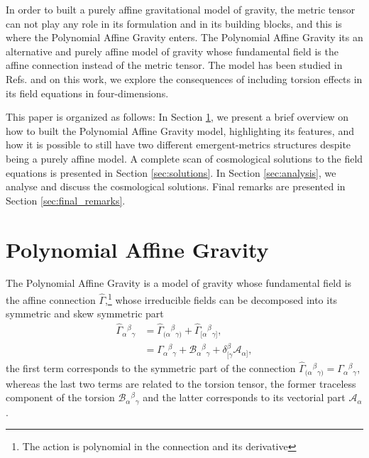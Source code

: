 \documentclass{article}
\providecommand{\ctG}[3]{\Gamma_{#1}{}^{ #2}{}_{#3}}
\providecommand{\B}[3]{\mathcal{B}_{#1}{}^{ #2}{}_{#3}}
\providecommand{\A}[1]{\mathcal{A}_{#1}}
\begin{document}
In order to built a purely affine gravitational model of gravity, the metric tensor can not play any role in its formulation and in its building blocks, and this is
where the Polynomial Affine Gravity enters. The Polynomial Affine Gravity its an alternative and purely affine model of gravity whose fundamental field is the affine connection instead
of the metric tensor. The model has been studied in Refs.\cite{castillofelisola2016polynomial,castillofelisola2016einsteins,castillofelisola2019cosmological,
Castillo_Felisola_2018,Castillo_Felisola_2020,Castillo_Felisola_2022_EPJC,Castillo_Felisola_2022_Universe} and on this work, we explore the
consequences of including torsion effects in its field equations in four-dimensions.

This paper is organized as follows: In Section \ref{sec:PAG}, we present a brief overview on how to built the Polynomial Affine Gravity model, highlighting
its features, and how it is possible to still have two different emergent-metrics structures despite being a purely affine model. A complete scan of cosmological
solutions to the field equations is presented in Section \ref{sec:solutions}. In Section \ref{sec:analysis}, we analyse and discuss the cosmological 
solutions. Final remarks are presented in Section \ref{sec:final_remarks}. 

\section{Polynomial Affine Gravity}
\label{sec:PAG}

The Polynomial Affine Gravity is a model of gravity whose fundamental field is the affine connection $\hat{\Gamma}$,\footnote{The action is polynomial
in the connection and its derivative} whose irreducible fields can be decomposed into its symmetric and skew symmetric part
\begin{equation}
\begin{aligned}
    \label{affine_connection}
    \hat{\Gamma}_{\alpha}{}^{\beta}{}_{\gamma} & = \hat{\Gamma}_{(\alpha}{}^{\beta}{}_{\gamma)} +  \hat{\Gamma}_{[\alpha}{}^{\beta}{}_{\gamma]},  \\
    & = \ctG{\alpha}{\beta}{\gamma} + \B{\alpha}{\beta}{\gamma} + \delta^{\beta}_{[\gamma}\A{\alpha]},
\end{aligned}
\end{equation}
the first term corresponds to the symmetric part of the connection $\hat{\Gamma}_{(\alpha}{}^{\beta}{}_{\gamma)} = \ctG{\alpha}{\beta}{\gamma}$, whereas
the last two terms are related to the torsion tensor, the former traceless component of the torsion $\B{\alpha}{\beta}{\gamma}$ and the latter corresponds 
to its vectorial part $\A{\alpha}$.
\end{document}
